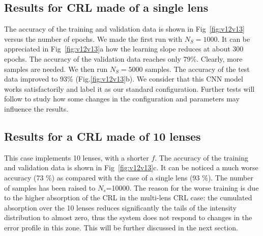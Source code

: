 \documentclass{iucr}
\newcommand{\inred}[1]{{\color{black}#1}}
\begin{document}
\subsection{Results for CRL made of a single lens}
 The accuracy of the training and validation data is shown in Fig~\ref{fig:v12v13} versus the number of epochs.
 We made the first run with $N_S=1000$.
 \inred{It can be appreciated in Fig~\ref{fig:v12v13}a how the learning slope reduces at about 300 epochs. The accuracy of the validation data reaches only 79\%.}
 Clearly, more samples are needed. We then run $N_S=5000$ samples. The accuracy of the test data improved to 93\% (Fig.\ref{fig:v12v13}b). 
 We consider that this CNN model works satisfactorily and label it as our standard configuration. Further tests will follow to study how some changes in the configuration and parameters may influence the results.

\subsection{Results for a CRL made of 10 lenses}
 This case implements 10 lenses, with a shorter $f$. The accuracy of the training and validation data is shown in 
 Fig~\ref{fig:v12v13}c.
 It can be noticed a much worse accuracy (\inred{73 \%}) as compared with the case of a single lens (\inred{93 \%}). The number of samples has been raised to $N_s$=10000. The reason for the worse training is due to the higher absorption of the CRL in the multi-lens CRL case: the cumulated absorption over the 10 lenses reduces significantly the tails of the intensity distribution to almost zero, thus the system does not respond to changes in the error profile in this zone. This will be further discussed in the next section.
 
\end{document}
